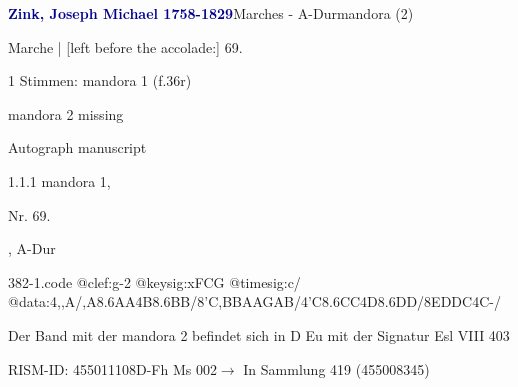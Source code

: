 \documentclass[twocolumn]{book}
\begin{document}
\par \vspace{7pt} \textcolor{darkblue}{\textbf{Zink, Joseph Michael  1758-1829}}\hfillplus{\textbf{[382]}}\newline Marches - A-Dur\newline mandora (2)
\par \begin{itshape}[f.36r, at left:] Marche | [left before the accolade:] 69.\end{itshape} 
\par \textcolor{darkblue}{}  1 Stimmen: mandora 1  (f.36r)\newline \begin{small} mandora 2 missing\end{small} \newline Autograph manuscript
\par 1.1.1  mandora 1, \begin{itshape}Nr. 69.\end{itshape}, A-Dur  
\begin{filecontents*}{382-1.code}
@clef:g-2
@keysig:xFCG
@timesig:c/
@data:4,,A/,A{8.6AA}4B{8.6BB}/8'C,BBAAGAB/4'C{8.6CC}4D{8.6DD}/8EDDC4C-/
\end{filecontents*}
\newline
%
\par Der Band mit der mandora 2 befindet sich in D Eu mit der Signatur Esl VIII 403
\par RISM-ID: 455011108\newline D-Fh  Ms 002\newline $\rightarrow$ In Sammlung 419 (455008345)
      
\end{document}
